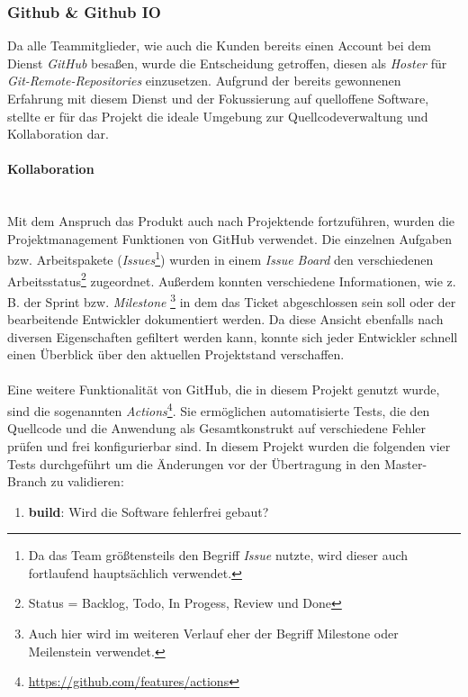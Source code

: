 \documentclass[10pt, a4paper]{article}
\begin{document}
\begin{onehalfspace}
      \subsubsection{Github \& Github IO}
      Da alle Teammitglieder, wie auch die Kunden bereits einen Account bei dem Dienst \textit{GitHub} besaßen, wurde die Entscheidung getroffen, diesen als \textit{Hoster} für \textit{Git-Remote-Repositories} einzusetzen.
      Aufgrund der bereits gewonnenen Erfahrung mit diesem Dienst und der Fokussierung auf quelloffene Software, stellte er für das Projekt die ideale Umgebung zur Quellcodeverwaltung und Kollaboration dar.

      \paragraph{Kollaboration} $~$ \\
      Mit dem Anspruch das Produkt auch nach Projektende fortzuführen, wurden die Projektmanagement Funktionen von GitHub verwendet. Die einzelnen Aufgaben bzw. Arbeitspakete (\textit{Issues}\footnote{Da das Team größtensteils den Begriff \textit{Issue} nutzte, wird dieser auch fortlaufend hauptsächlich verwendet.}) wurden in einem \textit{Issue Board} den verschiedenen Arbeitsstatus\footnote{Status = Backlog, Todo, In Progess, Review und Done}
      zugeordnet. Außerdem konnten verschiedene Informationen, wie z. B. der Sprint bzw. \textit{Milestone} \footnote{Auch hier wird im weiteren Verlauf eher der Begriff Milestone oder Meilenstein verwendet.} in dem das Ticket abgeschlossen sein soll oder der bearbeitende Entwickler dokumentiert werden.
      Da diese Ansicht ebenfalls nach diversen Eigenschaften gefiltert werden kann, konnte sich jeder Entwickler schnell einen Überblick über den aktuellen Projektstand verschaffen.
      \\~\\
      Eine weitere Funktionalität von GitHub, die in diesem Projekt genutzt wurde, sind die sogenannten \textit{Actions}\footnote{\raggedright\url{https://github.com/features/actions}}.
      Sie ermöglichen automatisierte Tests, die den Quellcode und die Anwendung als Gesamtkonstrukt auf verschiedene Fehler prüfen und frei konfigurierbar sind.\newpage
      In diesem Projekt wurden die folgenden vier Tests durchgeführt um die Änderungen vor der Übertragung in den Master-Branch zu validieren:
      \begin{enumerate}
        \item \textbf{build}: Wird die Software fehlerfrei gebaut?

\end{enumerate}
\end{onehalfspace}
\end{document}
